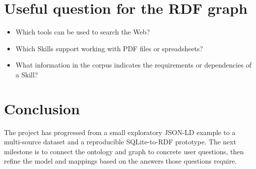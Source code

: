 \documentclass[11pt,a4paper]{article}
\begin{document}
\section{Useful question for the RDF graph}

\begin{itemize}
    \item Which tools can be used to search the Web?
    \item Which Skills support working with PDF files or spreadsheets?
    \item What information in the corpus indicates the requirements or dependencies of a Skill?
\end{itemize}

\section{Conclusion}

The project has progressed from a small exploratory JSON-LD example to a
multi-source dataset and a reproducible SQLite-to-RDF prototype. The next
milestone is to connect the ontology and graph to concrete user questions, then
refine the model and mappings based on the answers those questions require.
\end{document}
